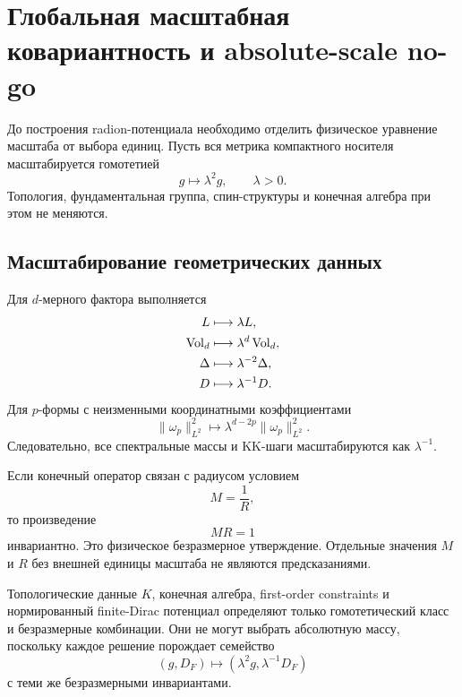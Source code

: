 \chapter{Глобальная масштабная ковариантность и absolute-scale no-go}

До построения radion-потенциала необходимо отделить физическое уравнение
масштаба от выбора единиц. Пусть вся метрика компактного носителя
масштабируется гомотетией
\begin{equation}
 g\longmapsto \lambda^2 g,
 \qquad \lambda>0.
\end{equation}
Топология, фундаментальная группа, спин-структуры и конечная алгебра при
этом не меняются.

\section{Масштабирование геометрических данных}

Для \(d\)-мерного фактора выполняется
\begin{align}
 L&\longmapsto\lambda L,\\
 \operatorname{Vol}_d&\longmapsto\lambda^d\operatorname{Vol}_d,\\
 \Delta&\longmapsto\lambda^{-2}\Delta,\\
 D&\longmapsto\lambda^{-1}D.
\end{align}
Для \(p\)-формы с неизменными координатными коэффициентами
\begin{equation}
 \|\omega_p\|_{L^2}^2
 \longmapsto
 \lambda^{d-2p}\|\omega_p\|_{L^2}^2.
\end{equation}
Следовательно, все спектральные массы и KK-шаги масштабируются как
\(\lambda^{-1}\).

Если конечный оператор связан с радиусом условием
\begin{equation}
 M=\frac1R,
\end{equation}
то произведение
\begin{equation}
 MR=1
\end{equation}
инвариантно. Это физическое безразмерное утверждение. Отдельные значения
\(M\) и \(R\) без внешней единицы масштаба не являются предсказаниями.

\begin{theorem}
Топологические данные \(K\), конечная алгебра, first-order constraints и
нормированный finite-Dirac потенциал определяют только гомотетический класс
и безразмерные комбинации. Они не могут выбрать абсолютную массу, поскольку
каждое решение порождает семейство
\begin{equation}
 (g,D_F)\longmapsto
 (\lambda^2g,\lambda^{-1}D_F)
\end{equation}
с теми же безразмерными инвариантами.
\end{theorem}

